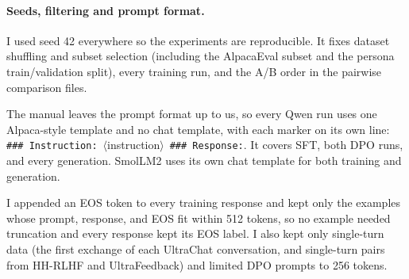 \begin{table}[H]
\centering
\caption{Fixed evaluation sets. ``Alignment tax'' means evaluating a DPO model on the other track's prompts.}
\label{tab:evalsets}

\end{table}

\paragraph{Seeds, filtering and prompt format.} I used seed 42 everywhere so the experiments are reproducible. It fixes dataset shuffling and subset selection (including the AlpacaEval subset and the persona train/validation split), every training run, and the A/B order in the pairwise comparison files.

The manual leaves the prompt format up to us, so every Qwen run uses one Alpaca-style template and no chat template, with each marker on its own line: \mbox{\texttt{\#\#\# Instruction:}}\ $\langle$instruction$\rangle$\ \mbox{\texttt{\#\#\# Response:}}. It covers SFT, both DPO runs, and every generation. SmolLM2 uses its own chat template for both training and generation.

I appended an EOS token to every training response and kept only the examples whose prompt, response, and EOS fit within 512 tokens, so no example needed truncation and every response kept its EOS label. I also kept only single-turn data (the first exchange of each UltraChat conversation, and single-turn pairs from HH-RLHF and UltraFeedback) and limited DPO prompts to 256 tokens.